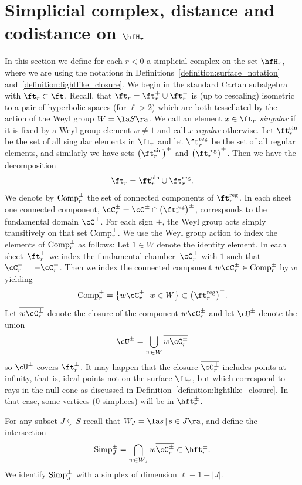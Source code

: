 \section[Simplicial complex, distance and codistance on $\hfH_r$]{Simplicial complex, distance and codistance on $\boldsymbol{\hfH_r}$}\label{section:simplicial structure}

In this section we define for each $r<0$ a simplicial complex on the set $\hfH_r$, where we are using the notations in Definitions~\ref{definition:surface_notation} and~\ref{definition:lightlike_closure}. We begin in the standard Cartan subalgebra with $\ft_r\subset \ft$. Recall, that $\ft_{r} = \ft_{r}^+ \cup \ft_{r}^-$ is (up to rescaling) isometric to a pair of hyperbolic spaces (for $\ell>2$) which are both tessellated by the action of the Weyl group $W = \la S\ra$. We call an element $x\in \ft_r$ {\em singular} if it is fixed by a Weyl group element $w\neq 1$ and call $x$ {\em regular} otherwise. Let $\ft^{\sin}_r$ be the set of all singular elements in $\ft_r$ and let $\ft^{\rm reg}_r$ be the set of all regular elements, and similarly we have sets $\big(\ft^{\sin}_r\big)^\pm$ and $\big(\ft^{\rm reg}_r\big)^\pm$. Then we have the decomposition
\[\ft_r=\ft^{\sin}_r\cup \ft^{\rm reg}_r.\]
We denote by ${\rm Comp}_r^\pm$ the set of connected components of $\ft^{\rm reg}_r$.
In each sheet one connected component, $\cC^\pm_r = \cC^\pm\cap\big(\ft_{r}^{\rm reg}\big)^\pm$, corresponds to the fundamental domain $\cC^\pm$. For each sign $\pm$, the Weyl group acts simply transitively on that set ${\rm Comp}_r^\pm$. We use the Weyl group action to index the elements of ${\rm Comp}_r^\pm$ as follows: Let $1\in W$ denote the identity element. In each sheet~$\ft_r^\pm$ we index the
fundamental chamber~$\cC_r^\pm$ with $1$ such that $\cC_r^- = - \cC_r^+$.
Then we index the connected component $w\cC_r^\pm\in {\rm Comp}_r^\pm$ by
$w$ yielding
\[{\rm Comp}_r^\pm = \big\{w\cC^\pm_r \,|\, w\in W \big\}\subset \big(\ft^{\rm reg}_r\big)^\pm.\]
Let $\overline{w\cC^\pm_r}$ denote the closure of the component $w\cC^\pm_r$ and let $\cU^\pm$ denote the union
\[\cU^\pm = \bigcup_{w\in W} \overline{w\cC^\pm_r}\]
so $\cU^\pm$ covers $\ft_{r}^\pm$. It may happen that the closure $\overline{\cC^\pm_r}$ includes points at infinity, that is, ideal points not on the surface $\ft_{r}$, but which correspond to rays in the null cone as discussed in Definition~\ref{definition:lightlike_closure}. In that case, some vertices ($0$-simplices) will be in $\hft_r^\pm$.

For any subset $J\subsetneq S$ recall that $W_J = \la s\,|\, s\in J\ra$, and define the intersection
\[{\rm Simp}_J^\pm = \bigcap_{w\in W_J} w\overline{\cC^\pm_r} \subset \hft_r^\pm.\]
We identify ${\rm Simp}_J^\pm$ with a simplex of dimension $\ell-1-|J|$.

